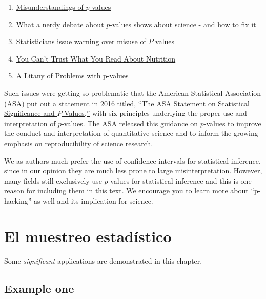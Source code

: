 \documentclass[
]{book}
\providecommand{\tightlist}{%
  \setlength{\itemsep}{0pt}\setlength{\parskip}{0pt}}
\begin{document}
\begin{enumerate}
\def\labelenumi{\arabic{enumi}.}
\tightlist
\item
  \href{https://en.wikipedia.org/wiki/Misunderstandings_of_p-values}{Misunderstandings of \(p\)-values}
\item
  \href{https://www.vox.com/science-and-health/2017/7/31/16021654/p-values-statistical-significance-redefine-0005}{What a nerdy debate about \(p\)-values shows about science - and how to fix it}
\item
  \href{https://www.nature.com/news/statisticians-issue-warning-over-misuse-of-p-values-1.19503}{Statisticians issue warning over misuse of \(P\) values}
\item
  \href{https://fivethirtyeight.com/features/you-cant-trust-what-you-read-about-nutrition/}{You Can't Trust What You Read About Nutrition}
\item
  \href{http://www.fharrell.com/post/pval-litany/}{A Litany of Problems with p-values}
\end{enumerate}

Such issues were getting so problematic that the American Statistical Association (ASA) put out a statement in 2016 titled, \href{https://www.amstat.org/asa/files/pdfs/P-ValueStatement.pdf}{``The ASA Statement on Statistical Significance and \(P\)-Values,''} with six principles underlying the proper use and interpretation of \(p\)-values. The ASA released this guidance on \(p\)-values to improve the conduct and interpretation of quantitative science and to inform the growing emphasis on reproducibility of science research.

We as authors much prefer the use of confidence intervals for statistical inference, since in our opinion they are much less prone to large misinterpretation. However, many fields still exclusively use \(p\)-values for statistical inference and this is one reason for including them in this text. We encourage you to learn more about ``p-hacking'' as well and its implication for science.

\hypertarget{el-muestreo-estaduxedstico}{%
\chapter{El muestreo estadístico}\label{el-muestreo-estaduxedstico}}

Some \emph{significant} applications are demonstrated in this chapter.

\hypertarget{example-one}{%
\section{Example one}\label{example-one}}
\end{document}
